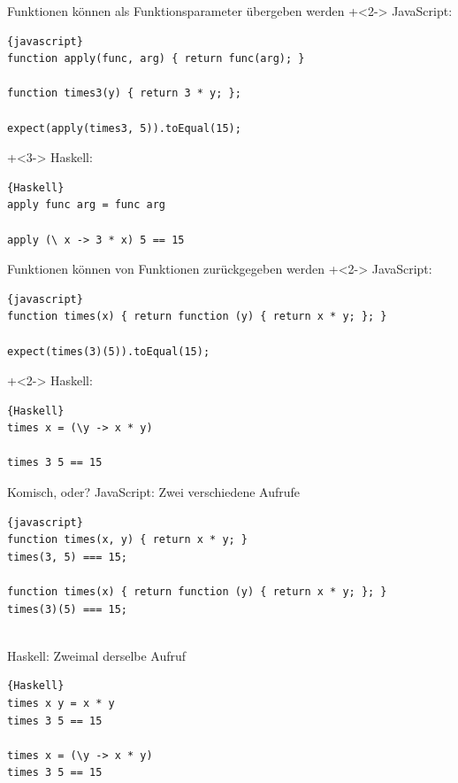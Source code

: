 \begin{frame}[fragile]{Funktionen können als Funktionsparameter übergeben werden}
\onslide+<2->
JavaScript:
\begin{lstlisting}{javascript}
function apply(func, arg) { return func(arg); }

function times3(y) { return 3 * y; };

expect(apply(times3, 5)).toEqual(15);
\end{lstlisting}

\onslide+<3->
Haskell:
\begin{lstlisting}{Haskell}
apply func arg = func arg

apply (\ x -> 3 * x) 5 == 15
\end{lstlisting}

\end{frame}

\begin{frame}[fragile]{Funktionen können von Funktionen zurückgegeben werden}
\onslide+<2->
JavaScript:
\begin{lstlisting}{javascript}
function times(x) { return function (y) { return x * y; }; }

expect(times(3)(5)).toEqual(15);
\end{lstlisting}

\onslide+<2->
Haskell:
\begin{lstlisting}{Haskell}
times x = (\y -> x * y)

times 3 5 == 15
\end{lstlisting}

\end{frame}

\begin{frame}[fragile]{Komisch, oder?}
JavaScript: Zwei verschiedene Aufrufe
\begin{lstlisting}{javascript}
function times(x, y) { return x * y; }
times(3, 5) === 15;

function times(x) { return function (y) { return x * y; }; }
times(3)(5) === 15;
\end{lstlisting}
~\\
Haskell: Zweimal derselbe Aufruf
\begin{lstlisting}{Haskell}
times x y = x * y
times 3 5 == 15

times x = (\y -> x * y)
times 3 5 == 15
\end{lstlisting}

\end{frame}

